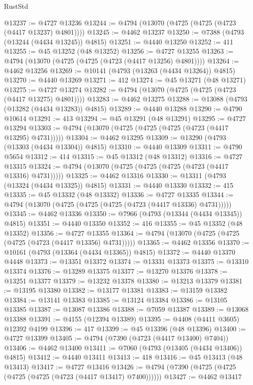\begin{lexlean}{RustStd}
\begin{coremodule}
{\begin{coremodule}
{{{{{{{{{{{{{{{{{{{{{{{{{{{{{{{{{{{{{{{{{{{{{{{{{{{{{{{{{{{{@13237 := @4727 @13236
@13244 := @4794 (@13070 (@4725 (@4725 (@4723 (@4417 @13237) @4801))))
@13245 := @4462 @13237
@13250 := @7388 (@4793 (@13244 (@4434 @13245)) @4815)
@13251 := @4440 @13250
@13252 := 411
@13255 := @45 @13252 (@48 @13252)
@13256 := @4727 @13255
@13263 := @4794 (@13070 (@4725 (@4725 (@4723 (@4417 @13256) @4801))))
@13264 := @4462 @13256
@13269 := @10141 (@4793 (@13263 (@4434 @13264)) @4815)
@13270 := @4440 @13269
@13271 := 412
@13274 := @45 @13271 (@48 @13271)
@13275 := @4727 @13274
@13282 := @4794 (@13070 (@4725 (@4725 (@4723 (@4417 @13275) @4801))))
@13283 := @4462 @13275
@13288 := @13088 (@4793 (@13282 (@4434 @13283)) @4815)
@13289 := @4440 @13288
@13290 := @4790 @10614
@13291 := 413
@13294 := @45 @13291 (@48 @13291)
@13295 := @4727 @13294
@13303 := @4794 (@13070 (@4725 (@4725 (@4725 (@4723 (@4417 @13295) @4731)))))
@13304 := @4462 @13295
@13309 := @13290 (@4793 (@13303 (@4434 @13304)) @4815)
@13310 := @4440 @13309
@13311 := @4790 @5654
@13312 := 414
@13315 := @45 @13312 (@48 @13312)
@13316 := @4727 @13315
@13324 := @4794 (@13070 (@4725 (@4725 (@4725 (@4723 (@4417 @13316) @4731)))))
@13325 := @4462 @13316
@13330 := @13311 (@4793 (@13324 (@4434 @13325)) @4815)
@13331 := @4440 @13330
@13332 := 415
@13335 := @45 @13332 (@48 @13332)
@13336 := @4727 @13335
@13344 := @4794 (@13070 (@4725 (@4725 (@4725 (@4723 (@4417 @13336) @4731)))))
@13345 := @4462 @13336
@13350 := @7966 (@4793 (@13344 (@4434 @13345)) @4815)
@13351 := @4440 @13350
@13352 := 416
@13355 := @45 @13352 (@48 @13352)
@13356 := @4727 @13355
@13364 := @4794 (@13070 (@4725 (@4725 (@4725 (@4723 (@4417 @13356) @4731)))))
@13365 := @4462 @13356
@13370 := @10161 (@4793 (@13364 (@4434 @13365)) @4815)
@13372 := @4440 @13370 @4448
@13373 := @13351 @13372
@13374 := @13331 @13373
@13375 := @13310 @13374
@13376 := @13289 @13375
@13377 := @13270 @13376
@13378 := @13251 @13377
@13379 := @13232 @13378
@13380 := @13213 @13379
@13381 := @13195 @13380
@13382 := @13177 @13381
@13383 := @13159 @13382
@13384 := @13141 @13383
@13385 := @13124 @13384
@13386 := @13105 @13385
@13387 := @13087 @13386
@13388 := @7059 @13387
@13389 := @13068 @13388
@13391 := @4155 (@12394 @13389)
@13395 := @4408 (@4411 @3605) @12392 @4199
@13396 := 417
@13399 := @45 @13396 (@48 @13396)
@13400 := @4727 @13399
@13405 := @4794 (@7390 (@4723 (@4417 @13400) @7404))
@13406 := @4462 @13400
@13411 := @7060 (@4793 (@13405 (@4434 @13406)) @4815)
@13412 := @4440 @13411
@13413 := 418
@13416 := @45 @13413 (@48 @13413)
@13417 := @4727 @13416
@13426 := @4794 (@7390 (@4725 (@4725 (@4725 (@4725 (@4723 (@4417 @13417) @7400))))))
@13427 := @4462 @13417
}}}}}}}}}}}}}}}}}}}}}}}}}}}}}}}}}}}}}}}}}}}}}}}}}}}}}}}}}}}}
\end{coremodule}}
\end{coremodule}
\end{lexlean}
